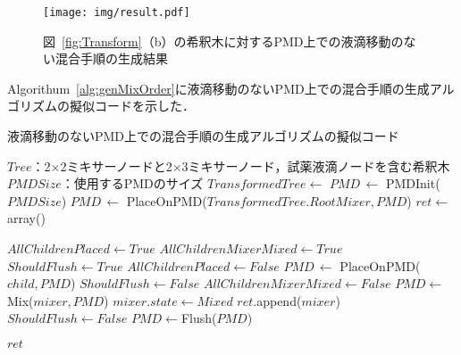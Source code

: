 \begin{figure}[tbp]
 \centering\texttt{[image: img/result.pdf]}
    \caption{図~\ref{fig:Transform}（b）の希釈木に対するPMD上での液滴移動のない混合手順の生成結果}\label{fig:result}
\end{figure}

Algorithum~\ref{alg:genMixOrder}に液滴移動のないPMD上での混合手順の生成アルゴリズムの擬似コードを示した．
\begin{algorithm}[tbp]
 \caption{液滴移動のないPMD上での混合手順の生成アルゴリズムの擬似コード}\label{alg:genMixOrder}
 \begin{algorithmic}[1]
     \Require $\mathit{Tree}$：2$\times$2ミキサーノードと2$\times$3ミキサーノード，試薬液滴ノードを含む希釈木 
     \Require $\mathit{PMDSize}$：使用するPMDのサイズ
     \State $\mathit{TransformedTree} \gets$  
     \State $\mathit{PMD}\,\gets $  PMDInit($\mathit{PMDSize}$)
     \State $\mathit{PMD}\,\gets $  PlaceOnPMD($\mathit{TransformedTree.RootMixer,PMD}$)
     \State $\mathit{ret} \gets $array() 

    \State {}
        \State $\mathit{AllChildrenPlaced}\gets\mathit{True}$
        \State $\mathit{AllChildrenMixerMixed}\gets\mathit{True}$
        \State $\mathit{ShouldFlush}\gets\mathit{True}$
                \State$\mathit{AllChildrenPlaced \gets False}$
                \State $\mathit{PMD}\, \gets$  PlaceOnPMD($\mathit{child,PMD}$) 
                \State $\mathit{ShouldFlush}\gets\mathit{False}$
            \EndIf 
                \State $\mathit{AllChildrenMixerMixed}\gets\mathit{False}$
            \EndIf 
        \EndFor 
            \State$\mathit{PMD}\gets$Mix($\mathit{mixer,PMD}$)
            \State$\mathit{mixer.state} \gets \mathit{Mixed}$ 
            \State$\mathit{ret} $.append($\mathit{mixer}$) 
            \State $\mathit{ShouldFlush}\gets\mathit{False}$
        \EndIf
        \EndFor 
{}
                    \State $\mathit{PMD}\gets$Flush($\mathit{PMD}$)
                \EndIf
    \EndWhile 

     \Return $\mathit{ret}$
 \end{algorithmic}
\end{algorithm}

